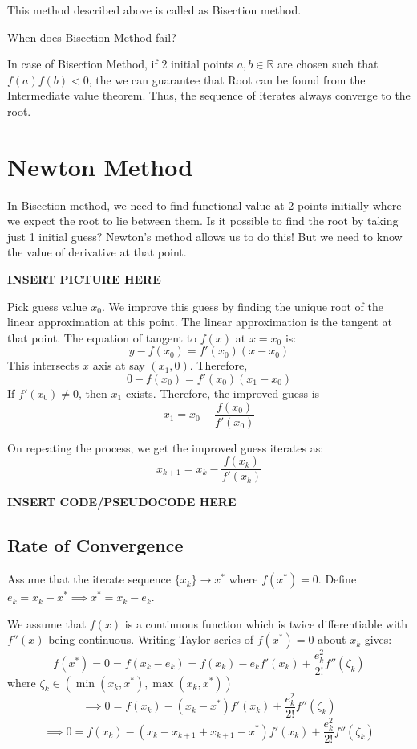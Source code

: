 \documentclass[
]{book}
\begin{document}
This method described above is called as Bisection method.

When does Bisection Method fail?

In case of Bisection Method, if 2 initial points \(a,b \in \mathbb{R}\) are chosen such that \(f(a)f(b)<0\), the we can guarantee that Root can be found from the Intermediate value theorem. Thus, the sequence of iterates always converge to the root.

\hypertarget{newton-method}{%
\section{Newton Method}\label{newton-method}}

In Bisection method, we need to find functional value at 2 points initially where we expect the root to lie between them. Is it possible to find the root by taking just 1 initial guess? Newton's method allows us to do this! But we need to know the value of derivative at that point.

\textbf{INSERT PICTURE HERE}

Pick guess value \(x_0\). We improve this guess by finding the unique root of the linear approximation at this point. The linear approximation is the tangent at that point. The equation of tangent to \(f(x)\) at \(x=x_0\) is:
\[y-f(x_0) = f'(x_0) (x-x_0)\]
This intersects \(x\) axis at say \((x_1,0)\). Therefore,
\[0-f(x_0) =  f'(x_0) (x_1-x_0)\]
If \(f'(x_0)\neq 0\), then \(x_1\) exists. Therefore, the improved guess is
\begin{equation}
x_1 = x_0 - \frac{f(x_0)}{f'(x_0)}
\end{equation}

On repeating the process, we get the improved guess iterates as:
\begin{equation}
x_{k+1} = x_k - \frac{f(x_k)}{f'(x_k)}
\end{equation}

\textbf{INSERT CODE/PSEUDOCODE HERE}

\hypertarget{rate-of-convergence}{%
\subsection{Rate of Convergence}\label{rate-of-convergence}}

Assume that the iterate sequence \(\{x_k\}\to x^*\) where \(f(x^*)=0\).
Define \(e_k = x_k-x^* \implies x^*=x_k-e_k\).

We assume that \(f(x)\) is a continuous function which is twice differentiable with \(f''(x)\) being continuous. Writing Taylor series of \(f(x^*)=0\) about \(x_k\) gives:
\[f(x^*)=0= f(x_k-e_k) = f(x_k) - e_k f'(x_k)+\frac{e_k^2}{2!} f''(\zeta_k) \]
where \(\zeta_k \in (\min(x_k,x^*),\max(x_k,x^*))\)
\[\implies 0=f(x_k)-(x_k-x^*)f'(x_k)+\frac{e_k^2}{2!} f''(\zeta_k)\]
\[\implies 0 = f(x_k) - (x_k-x_{k+1}+x_{k+1}-x^*)f'(x_k) + \frac{e_k^2}{2!} f''(\zeta_k)\]
\end{document}
